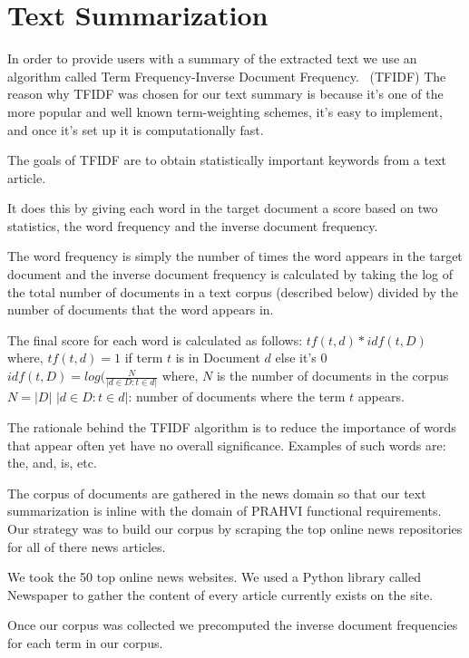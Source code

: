 \section{Text Summarization}
In order to provide users with a summary of the extracted text we use an algorithm called Term Frequency-Inverse Document Frequency.\footnotemark {} ~(TFIDF) The reason why TFIDF was chosen for our text summary is because it's one of the more popular and well known term-weighting schemes, it's easy to implement, and once it's set up it is computationally fast.

The goals of TFIDF are to obtain statistically important keywords from a text article. 

It does this by giving each word in the target document a score based on two statistics, the word frequency and the inverse document frequency.

The word frequency is simply the number of times the word appears in the target document and the inverse document frequency is calculated by taking the log of the total number of documents in a text corpus (described below) divided by the number of documents that the word appears in.

The final score for each word is calculated as follows: 
$tf(t, d) * idf(t, D)$  
where,
$tf(t, d) = 1$ if term $t$	is in Document $d$ else it's $0$
$idf(t, D) = log(\frac{N}{|d \in D : t \in d|}$
where,
$N$ is the number of documents in the corpus $N = |D|$
${|d \in D : t \in d|}$: number of documents where the term $t$ appears.

The rationale behind the TFIDF algorithm is to reduce the importance of words that appear often yet have no overall significance. Examples of such words are: the, and, is, etc.


The corpus of documents are gathered in the news domain so that our text summarization is inline with the domain of PRAHVI functional requirements. Our strategy was to build our corpus by scraping the top online news repositories for all of there news articles. 

We took the 50 top online news websites. We used a Python library called Newspaper to gather the content of every article currently exists on the site.

Once our corpus was collected we precomputed the inverse document frequencies for each term in our corpus.
